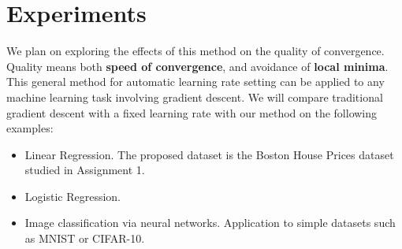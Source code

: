 \documentclass[]{article}
\begin{document}
\section{Experiments}
We plan on exploring the effects of this method on the quality of convergence. Quality means both \textbf{speed of convergence}, and avoidance of \textbf{local minima}. This general method for automatic learning rate setting can be applied to any machine learning task involving gradient descent. We will compare traditional gradient descent with a fixed learning rate with our method on the following examples:\\
\begin{itemize}
\item Linear Regression. The proposed dataset is the Boston House Prices dataset studied in Assignment 1.
\item Logistic Regression. 
\item Image classification via neural networks. Application to simple datasets such as MNIST or CIFAR-10. 	
\end{itemize}
\end{document}
